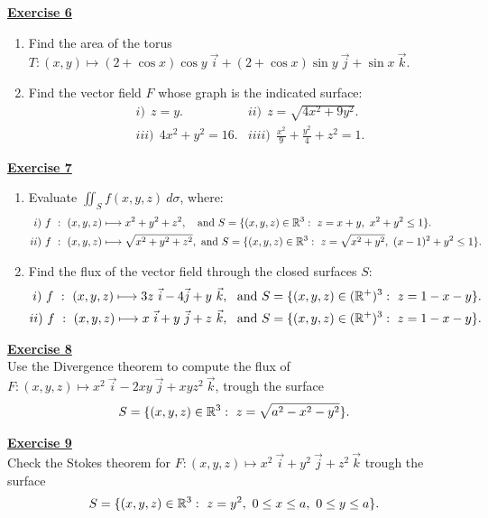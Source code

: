 \noindent\Large{\underline{\textbf{Exercise 6}}}
\normalsize{}
\begin{enumerate}
    \item Find the area of the torus $T : (x,y) \longmapsto 
                      (2 + \cos x)\cos y\ \vec{i} + (2 + \cos x)\sin y\ \vec{j} + \sin x\ \vec{k}$.
    \item Find the vector field $F$ whose graph is the indicated surface:
        \begin{align*}
            &i)\   \ z = y.
            &ii)\   \ z = \sqrt{4x^2 + 9y^2}.\\
            &iii)\ \ 4x^2 + y^2 = 16.
            &iiii)\ \ \frac{x^2}{9} + \frac{y^2}{4} + z^2 = 1.
        \end{align*}
\end{enumerate}
\noindent\Large{\underline{\textbf{Exercise 7}}}
\normalsize{}
\begin{enumerate}
    \item Evaluate $\displaystyle\iint_S f(x,y,z)\ d\sigma$, where:
        \begin{align*}
            i)\ f\ &:\ (x,y,z) \longmapsto x^2 + y^2 + z^2,\ \ \
                            \text{and $S = \{(x,y,z)\in\mathbb{R}^3:\ z = x + y,\ x^2 + y^2 \leq 1$\}.}\\
            ii)\ f\ &:\ (x,y,z) \longmapsto \sqrt{x^2 + y^2 + z^2},\
                            \text{and $S = \{(x,y,z)\in\mathbb{R}^3:\ z = \sqrt{x^2 + y^2},\ (x - 1)^2 + y^2 \leq 1$\}.}
        \end{align*}
    \item Find the flux of the vector field through the closed surfaces $S$:
        \begin{align*}
            i)\ f\ :\ (x,y,z) \longmapsto 3z\ \vec{i} - 4\vec{j} + y\ \vec{k},\ 
                                        \text{ and $S = \{(x,y,z)\in(\R^+)^3:\ z = 1 - x - y\}$.}\\
            ii)\ f\ :\ (x,y,z) \longmapsto x\ \vec{i} + y\ \vec{j} + z\ \vec{k},\
                                        \text{ and $S = \{(x,y,z)\in(\R^+)^3:\ z = 1 - x - y\}$.}
        \end{align*}
\end{enumerate}

\noindent\Large{\underline{\textbf{Exercise 8}}}
\normalsize{}\\
\noindent Use the Divergence theorem to compute the flux of $F : (x,y,z) \longmapsto 
x^2\ \vec{i} - 2xy\ \vec{j} + xyz^2\ \vec{k}$, trough the surface $$S = \{(x,y,z)\in\mathbb{R}^3:\ z = \sqrt{a^2 - x^2 - y^2}\}.$$

\noindent\Large{\underline{\textbf{Exercise 9}}}
\normalsize{}\\
Check the Stokes theorem for $F : (x,y,z) \longmapsto x^2\ \vec{i} + y^2\ \vec{j} + z^2\ \vec{k}$
trough the surface\\ $$S = \{(x,y,z)\in\mathbb{R}^3:\ z = y^2,\ 0\leq x\leq a,\ 0\leq y\leq a\}.$$
